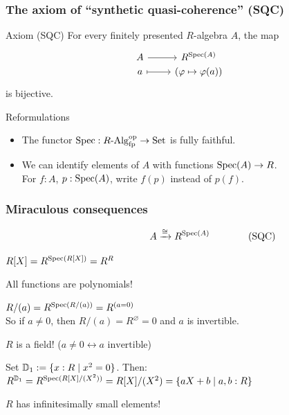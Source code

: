 \documentclass[aspectratio=1610]{beamer}
\begin{document}
\begin{frame}[fragile] %
  \frametitle{The axiom of \enquote{synthetic quasi-coherence} (SQC)}
  \begin{block}{Axiom (SQC)}
    For every finitely presented $R$-algebra $A$,
    the map
    \[\begin{tikzcd}[row sep=0pt]
      A \ar[r] & R^{\Spec(A)} \\
      a \ar[r, mapsto] & (\varphi \mapsto \varphi(a))
    \end{tikzcd}\]
    is bijective.
  \end{block}

  \pause%
  \begin{block}{Reformulations}
    \begin{itemize}
      \item
        The functor $\operatorname{Spec} : R\text{-}\mathrm{Alg}_{\mathrm{fp}}^{\mathrm{op}} \to \mathrm{Set}$ is fully faithful.
      \pause%
      \item
        We can identify elements of $A$ with functions $\operatorname{Spec}(A) \to R$.\\
        For $f : A$, $p : \operatorname{Spec}(A)$, write $f(p)$ instead of $p(f)$.
    \end{itemize}
  \end{block}
\end{frame}

\begin{frame}
  \frametitle{Miraculous consequences}

  \[A \xrightarrow{\cong} R^{\Spec(A)} \rlap{\qquad\qquad \text{(SQC)}}\]

  \pause%
  \begin{corollary}
    $R[X] = R^{\operatorname{Spec}(R[X])} = R^R$
  \end{corollary}
  \pause%
  \alert{All functions are polynomials!}

  \pause%
  \begin{corollary}
    $R/(a) = R^{\operatorname{Spec}(R/(a))} = R^{(a = 0)}$\\
    So if $a \neq 0$, then $R/(a) = R^{\varnothing} = 0$ and $a$ is invertible.
  \end{corollary}
  \pause%
  \alert{$R$ is a field! ($a \neq 0 \leftrightarrow \text{$a$ invertible}$)}

  \pause%
  \begin{corollary}
    Set $\mathbb{D}_1 := \{x : R \mid x^2 = 0\}$. Then:\\
    $R^{\mathbb{D}_1} = R^{\operatorname{Spec}(R[X]/(X^2))} = R[X]/(X^2) = \{ aX + b \mid a, b : R \}$
  \end{corollary}
  \pause%
  \alert{$R$ has infinitesimally small elements!}
\end{frame}
\end{document}
